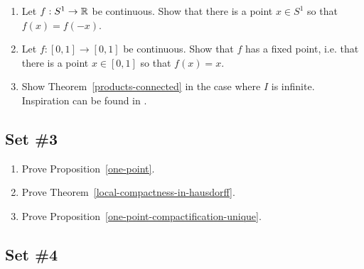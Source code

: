 \begin{enumerate}
  \item Let $f : S^1 \to \mathbb{R}$ be continuous. Show that there is a point $x \in S^1$ so that $f(x) = f(-x)$.
  \item Let $f : [0,1] \to [0,1]$ be continuous. Show that $f$ has a fixed point, i.e. that there is a point $x \in [0,1]$ so that $f(x) = x$.
  \item \label{exercise-products-connected} Show Theorem~\ref{products-connected} in the case where $I$ is infinite. Inspiration can be found in \cite[Ex.~23.7]{Mun}.
\end{enumerate}

\subsection{Set \#3}
  \begin{enumerate}
    \item \label{one-point-exercise}Prove Proposition~\ref{one-point}.
    \item \label{local-compactness-in-hausdorff-exercise}Prove Theorem~\ref{local-compactness-in-hausdorff}.
    \item \label{one-point-compactification-unique-exercise}Prove Proposition~\ref{one-point-compactification-unique}.
  \end{enumerate}
\subsection{Set \#4}
